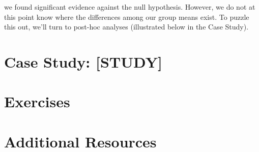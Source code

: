 we found significant evidence against the null hypothesis. However, we do not at this point know where the differences among our group means exist. To puzzle this out, we'll turn to post-hoc analyses (illustrated below in the Case Study).

\section{Case Study: [STUDY]}

\section{Exercises}

\section{Additional Resources}

